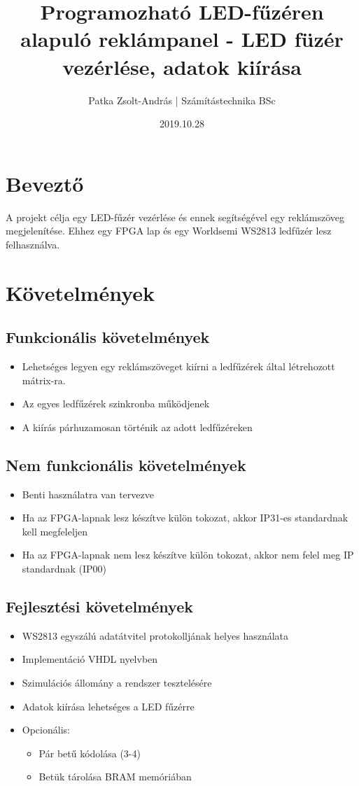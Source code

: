 \documentclass[10pt]{article} %
\title{Programozható LED-fűzéren alapuló reklámpanel - LED füzér vezérlése, adatok kiírása}
\author{Patka Zsolt-András | Számítástechnika BSc}
\date{2019.10.28}
\begin{document}
\maketitle

\section{Beveztő}

A projekt célja egy LED-fűzér vezérlése és ennek segítségével egy reklámszöveg megjelenítése. Ehhez egy FPGA lap és egy Worldsemi WS2813 ledfűzér lesz felhasználva.

\section{Követelmények}

\subsection{Funkcionális követelmények}
\begin{itemize}
\item Lehetséges legyen egy reklámszöveget kiírni a ledfűzérek által létrehozott mátrix-ra.
\item Az egyes ledfűzérek szinkronba működjenek
\item A kiírás párhuzamosan történik az adott ledfűzéreken
\end{itemize}

\subsection{Nem funkcionális követelmények}
\begin{itemize}
\item Benti használatra van tervezve
\item Ha az FPGA-lapnak lesz készítve külön tokozat, akkor IP31-es standardnak kell megfeleljen
\item Ha az FPGA-lapnak nem lesz készítve külön tokozat, akkor nem felel meg IP standardnak (IP00)
\end{itemize}

\subsection{Fejlesztési követelmények}
\begin{itemize}
\item WS2813 egyszálú adatátvitel protokolljának helyes használata
\item Implementáció VHDL nyelvben
\item Szimulációs állomány a rendszer tesztelésére
\item Adatok kiírása lehetséges a LED fűzérre
\item Opcionális: 
\begin{itemize}
	\item Pár betű kódolása (3-4)
	\item Betük tárolása BRAM memóriában
\end{itemize}
\end{itemize}
\end{document}
